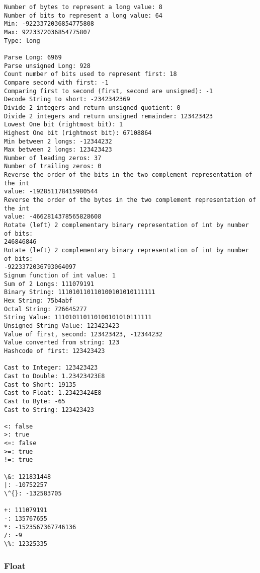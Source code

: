 \documentclass[9pt]{article}
\begin{document}
    \begin{Verbatim}[commandchars=\\\{\}]
Number of bytes to represent a long value: 8
Number of bits to represent a long value: 64
Min: -9223372036854775808
Max: 9223372036854775807
Type: long

Parse Long: 6969
Parse unsigned Long: 928
Count number of bits used to represent first: 18
Compare second with first: -1
Comparing first to second (first, second are unsigned): -1
Decode String to short: -2342342369
Divide 2 integers and return unsigned quotient: 0
Divide 2 integers and return unsigned remainder: 123423423
Lowest One bit (rightmost bit): 1
Highest One bit (rightmost bit): 67108864
Min between 2 longs: -12344232
Max between 2 longs: 123423423
Number of leading zeros: 37
Number of trailing zeros: 0
Reverse the order of the bits in the two complement representation of the int
value: -192851178415980544
Reverse the order of the bytes in the two complement representation of the int
value: -4662814378565828608
Rotate (left) 2 complementary binary representation of int by number of bits:
246846846
Rotate (left) 2 complementary binary representation of int by number of bits:
-9223372036793064097
Signum function of int value: 1
Sum of 2 Longs: 111079191
Binary String: 111010110110100101010111111
Hex String: 75b4abf
Octal String: 726645277
String Value: 111010110110100101010111111
Unsigned String Value: 123423423
Value of first, second: 123423423, -12344232
Value converted from string: 123
Hashcode of first: 123423423

Cast to Integer: 123423423
Cast to Double: 1.23423423E8
Cast to Short: 19135
Cast to Float: 1.23423424E8
Cast to Byte: -65
Cast to String: 123423423

<: false
>: true
<=: false
>=: true
!=: true

\&: 121831448
|: -10752257
\^{}: -132583705

+: 111079191
-: 135767655
*: -1523567367746136
/: -9
\%: 12325335
    \end{Verbatim}

    \hypertarget{float}{%
\subsubsection{Float}\label{float}}
\end{document}
